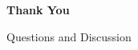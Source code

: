 \begin{frame}[plain]

\vfill

{\fontsize{28}{34}\selectfont
    \bfseries
    \color{TitleColor}
    Thank You
}

\vspace{0.45cm}

{\fontsize{15}{20}\selectfont
    \color{SecondaryColor}
    Questions and Discussion
}

\vspace{1.0cm}

{\fontsize{11}{14}\selectfont
    \insertauthor
}

\vfill

\end{frame}

